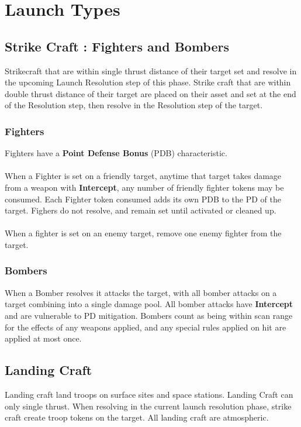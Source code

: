\section{Launch Types}

\subsection{Strike Craft : Fighters and Bombers}

Strikecraft that are within single thrust distance of their target set and resolve in the upcoming Launch Resolution step of this phase. Strike craft that are within double thrust distance of their target are placed on their asset and set at the end of the Resolution step, then resolve in the Resolution step of the target.

\subsubsection{Fighters}
Fighters have a \textbf{Point Defense Bonus} (PDB) characteristic.
\\\\
When a Fighter is set on a friendly target, anytime that target takes damage from a weapon with \textbf{Intercept}, any number of friendly fighter tokens may be consumed. Each Fighter token consumed adds its own PDB to the PD of the target. Fighers do not resolve, and remain set until activated or cleaned up.
\\\\
When a fighter is set on an enemy target, remove one enemy fighter from the target. 

\subsubsection{Bombers}
When a Bomber resolves it attacks the target, with all bomber attacks on a target combining into a single damage pool. All bomber attacks have \textbf{Intercept} and are vulnerable to PD mitigation. Bombers count as being within scan range for the effects of any weapons applied, and any special rules applied on hit are applied at most once. 

\subsection{Landing Craft}
Landing craft land troops on surface sites and space stations. Landing Craft can only single thrust. When resolving in the current launch resolution phase, strike craft create troop tokens on the target. All landing craft are atmospheric.


